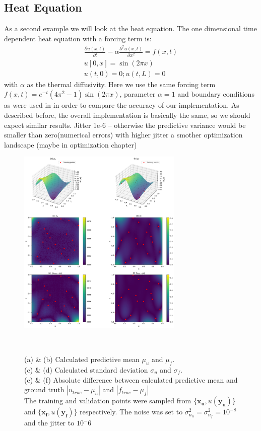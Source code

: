 \documentclass{article}
\begin{document}
\subsection{Heat Equation}
As a second example we will look at the heat equation.
The one dimensional time dependent heat equation with a forcing term is:
\begin{equation}
    \begin{aligned}
         \frac{\partial u(x,t)}{\partial t} - \alpha \frac{\partial^2 u(x,t)}{\partial x^2} = f(x,t) 
        \\ u[0,x] = \sin{(2\pi x)}
        \\ u(t,0) = 0; u(t,L) = 0
    \end{aligned}
\end{equation}
with $\alpha$ as the thermal diffusivity. Here we use the same forcing term $f(x,t) = e^{-t}(4\pi^2-1)\sin{(2\pi x)}$, parameter $\alpha = 1$ and boundary conditions as were used in \cite{RAISSI} in order to compare the accuracy of our implementation. As described before, the overall implementation is basically the same, so we should expect similar results. Jitter 1e-6 -- otherwise the predictive variance would be smaller than zero(numerical errors) with higher jitter a smother optimization landscape (maybe in optimization chapter)
\begin{figure}
    \centering
    \includegraphics[width=0.7\textwidth]{../final_examples/heat_equation/merged_plots.png}
    \caption{(a) \& (b) Calculated predictive mean $\mu_u$ and $\mu_f$.\\ 
    (c) \& (d) Calculated standard deviation $\sigma_{u}$ and $\sigma_f$.\\
    (e) \& (f) Absolute difference between calculated predictive mean and ground truth $|u_{true}-\mu_u|$ and $|f_{true}-\mu_f|$\\
    The training and validation points were sampled from $\{\bm{x_u},u(\bm{y_u})\}$ and $\{\bm{x_f},u(\bm{y_f})\}$ respectively. The noise was set to $\sigma_{n_u}^2 = \sigma_{n_f}^2 = 10^{-8}$ and the jitter to $10^-6$}
    ~\label{fig:training_points_wave}
\end{figure}
\end{document}
